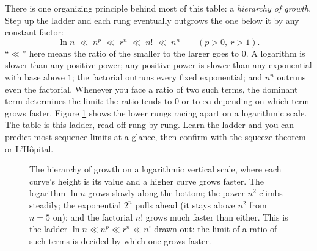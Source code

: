 \begin{happeningbox}
There is one organizing principle behind most of this table: a
\emph{hierarchy of growth}. Step up the ladder and each rung eventually outgrows
the one below it by any constant factor:
\[
  \ln n \;\ll\; n^p \;\ll\; r^n \;\ll\; n! \;\ll\; n^n
  \qquad (p > 0,\ r > 1).
\]
``$\ll$'' here means the ratio of the smaller to the larger goes to $0$. A
logarithm is slower than any positive power; any positive power is slower than
any exponential with base above $1$; the factorial outruns every fixed
exponential; and $n^n$ outruns even the factorial. Whenever you face a ratio of
two such terms, the dominant term determines the limit: the ratio tends to $0$
or to $\infty$ depending on which term grows faster.
Figure \ref{ch28:fig-ladder} shows the lower rungs racing apart on a logarithmic
scale. The
table is this ladder, read off rung by rung. Learn the ladder and you
can predict most sequence limits at a glance, then confirm with the squeeze
theorem or L'H\^opital.
\end{happeningbox}

\begin{figure}[H]
\centering
{}
\caption{The hierarchy of growth on a logarithmic vertical scale, where each
curve's height is its value and a higher curve grows faster. The logarithm
$\ln n$ grows slowly along the bottom; the power $n^2$ climbs steadily; the exponential
$2^n$ pulls ahead (it stays above $n^2$ from $n = 5$ on); and the factorial
$n!$ grows much faster than either. This is the ladder $\ln n \ll n^p \ll r^n \ll n!$
drawn out: the limit of a ratio of such terms is decided by
which one grows faster.}
\label{ch28:fig-ladder}
\end{figure}

